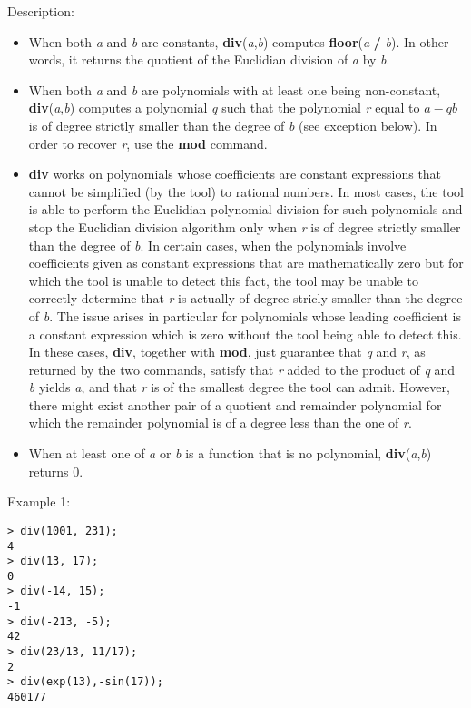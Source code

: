 \noindent Description: \begin{itemize}

\item When both \emph{a} and \emph{b} are constants, \textbf{div}(\emph{a},\emph{b}) computes
   \textbf{floor}(\emph{a} \textbf{/} \emph{b}). In other words, it returns the quotient of the Euclidian
   division of \emph{a} by \emph{b}.

\item When both \emph{a} and \emph{b} are polynomials with at least one being non-constant,
   \textbf{div}(\emph{a},\emph{b}) computes a polynomial \emph{q} such that the polynomial \emph{r} equal to
   $a-qb$ is of degree strictly smaller than the degree of \emph{b} (see
   exception below). In order to recover \emph{r}, use the \textbf{mod} command.

\item \textbf{div} works on polynomials whose coefficients are constant
   expressions that cannot be simplified (by the tool) to rational
   numbers. In most cases, the tool is able to perform the Euclidian
   polynomial division for such polynomials and stop the Euclidian
   division algorithm only when \emph{r} is of degree strictly smaller than
   the degree of \emph{b}. In certain cases, when the polynomials involve
   coefficients given as constant expressions that are mathematically
   zero but for which the tool is unable to detect this fact, the tool
   may be unable to correctly determine that \emph{r} is actually of degree
   stricly smaller than the degree of \emph{b}. The issue arises in particular
   for polynomials whose leading coefficient is a constant expression
   which is zero without the tool being able to detect this. In these
   cases, \textbf{div}, together with \textbf{mod}, just guarantee that \emph{q} and
   \emph{r}, as returned by the two commands, satisfy that \emph{r} added to the
   product of \emph{q} and \emph{b} yields \emph{a}, and that \emph{r} is of the smallest
   degree the tool can admit. However, there might exist another pair of
   a quotient and remainder polynomial for which the remainder polynomial
   is of a degree less than the one of \emph{r}.

\item When at least one of \emph{a} or \emph{b} is a function that is no polynomial,
   \textbf{div}(\emph{a},\emph{b}) returns $0$.
\end{itemize}
\noindent Example 1: 
\begin{center}\begin{minipage}{15cm}\begin{Verbatim}[frame=single]
> div(1001, 231);
4
> div(13, 17);
0
> div(-14, 15);
-1
> div(-213, -5);
42
> div(23/13, 11/17);
2
> div(exp(13),-sin(17));
460177
\end{Verbatim}
\end{minipage}\end{center}
